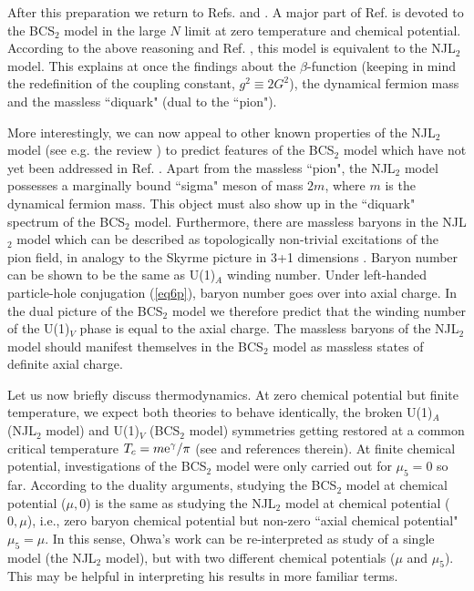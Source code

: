 \documentclass[a4paper,twocolumn,aps]{revtex4}
\begin{document}
After this preparation we return to Refs. \cite{R1} and \cite{R7}. A major part of Ref. \cite{R1} is
devoted to the BCS$_2$ model in the large $N$ limit at zero temperature and chemical potential. According
to the above reasoning and Ref. \cite{R1}, this model is equivalent to the NJL$_2$ model. This explains at once the findings
about the $\beta$-function (keeping in mind the redefinition of the coupling constant, $g^2\equiv
2 G^2$), the dynamical fermion mass and the massless ``diquark" (dual to the ``pion").
  
More interestingly, we
can now appeal to other known properties of the NJL$_2$ model (see e.g. the review \cite{R9}) to predict
features of the BCS$_2$ model which have not yet been addressed in Ref. \cite{R1}.
Apart from the massless ``pion", the NJL$_2$ model possesses a marginally bound
``sigma" meson of mass $2m$, where $m$ is the dynamical fermion mass. This object must also
show up in the ``diquark" spectrum of the BCS$_2$ model. Furthermore, there are massless baryons
in the NJL$_2$ model which can be described as topologically non-trivial excitations of the pion field,
in analogy to the Skyrme picture in 3+1 dimensions \cite{R9}. Baryon number can be shown to be 
the same as U(1)$_A$ winding number.
Under left-handed particle-hole conjugation (\ref{eq6p}), baryon number
goes over into axial charge.
In the dual picture of the BCS$_2$ model we therefore predict that the winding number of the U(1)$_V$ phase
is equal to the axial charge. The massless baryons of the NJL$_2$ model should manifest
themselves in the BCS$_2$ model as massless states of definite axial charge.

Let us now briefly discuss thermodynamics.
At zero chemical potential but finite temperature, we expect both theories to behave identically,
the broken U(1)$_A$ (NJL$_2$ model) and U(1)$_V$ (BCS$_2$ model) symmetries
getting restored at a common critical temperature $T_c=m{\rm e}^{\gamma}/\pi$ (see \cite{R9} and references
therein). At finite chemical potential, investigations of the BCS$_2$ model were only carried
out for $\mu_5=0$ so far. According to the duality arguments, studying the BCS$_2$ model at chemical potential
($\mu,0$) is the same as studying the NJL$_2$ model at chemical potential ($0,\mu$), i.e., zero baryon
chemical potential but non-zero ``axial chemical potential" $\mu_5=\mu$. In this sense, Ohwa's work \cite{R7}
can be re-interpreted as study of a single model (the NJL$_2$ model), but with two different chemical potentials
($\mu$ and $\mu_5$). This may be helpful in interpreting his results in more familiar terms.
\end{document}
